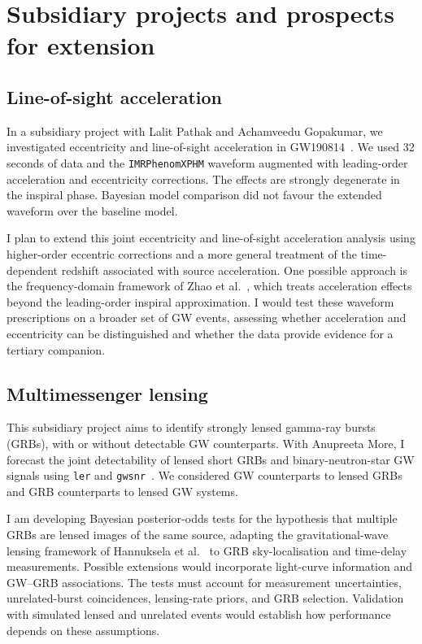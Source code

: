 \documentclass[11pt]{article}
\begin{document}
\newpage
\section*{Subsidiary projects and prospects for extension}
\subsection*{Line-of-sight acceleration}

In a subsidiary project with Lalit Pathak and Achamveedu Gopakumar, we investigated eccentricity and line-of-sight acceleration in GW190814~\cite{losa}. We used 32 seconds of data and the \texttt{IMRPhenomXPHM} waveform augmented with leading-order acceleration and eccentricity corrections. The effects are strongly degenerate in the inspiral phase. Bayesian model comparison did not favour the extended waveform over the baseline model.

I plan to extend this joint eccentricity and line-of-sight acceleration analysis using higher-order eccentric corrections and a more general treatment of the time-dependent redshift associated with source acceleration. One possible approach is the frequency-domain framework of Zhao et al.~\cite{zhao}, which treats acceleration effects beyond the leading-order inspiral approximation. I would test these waveform prescriptions on a broader set of GW events, assessing whether acceleration and eccentricity can be distinguished and whether the data provide evidence for a tertiary companion.

\subsection*{Multimessenger lensing}

This subsidiary project aims to identify strongly lensed gamma-ray bursts (GRBs), with or without detectable GW counterparts. With Anupreeta More, I forecast the joint detectability of lensed short GRBs and binary-neutron-star GW signals using \texttt{ler} and \texttt{gwsnr}~\cite{grb}. We considered GW counterparts to lensed GRBs and GRB counterparts to lensed GW systems.

I am developing Bayesian posterior-odds tests for the hypothesis that multiple GRBs are lensed images of the same source, adapting the gravitational-wave lensing framework of Hannuksela et al.~\cite{odds} to GRB sky-localisation and time-delay measurements. Possible extensions would incorporate light-curve information and GW--GRB associations. The tests must account for measurement uncertainties, unrelated-burst coincidences, lensing-rate priors, and GRB selection. Validation with simulated lensed and unrelated events would establish how performance depends on these assumptions.
\end{document}

